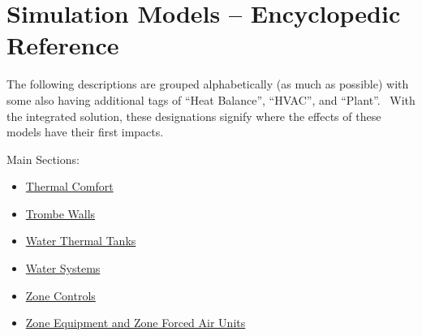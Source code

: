 \chapter{Simulation Models -- Encyclopedic Reference}\label{simulation-models-encyclopedic-reference-000}

The following descriptions are grouped alphabetically (as much as possible) with some also having additional tags of ``Heat Balance'', ``HVAC'', and ``Plant''.~ With the integrated solution, these designations signify where the effects of these models have their first impacts.

Main Sections:

\begin{itemize}
\tightlist
\item
  \protect\hyperlink{ThermalComfort}{Thermal Comfort}
\item
  \protect\hyperlink{TrombeWalls}{Trombe Walls}
\item
  \protect\hyperlink{WaterTanks}{Water Thermal Tanks}
\item
  \protect\hyperlink{WaterSystems}{Water Systems}
\item
  \protect\hyperlink{ZoneControls}{Zone Controls}
\item
  \protect\hyperlink{ZoneEquip}{Zone Equipment and Zone Forced Air Units} 
\end{itemize}
